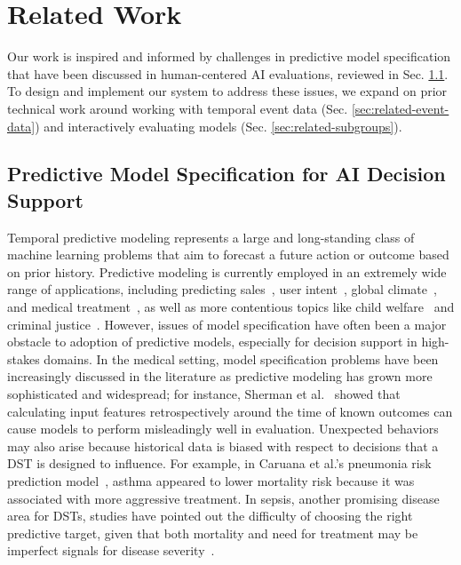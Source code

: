 \section{Related Work}
\label{sec:related-work}

Our work is inspired and informed by challenges in predictive model specification that have been discussed in human-centered AI evaluations, reviewed in Sec. \ref{sec:related-spec-issues}.
To design and implement our system to address these issues, we expand on prior technical work around working with temporal event data (Sec. \ref{sec:related-event-data}) and interactively evaluating models (Sec. \ref{sec:related-subgroups}).

\subsection{Predictive Model Specification for AI Decision Support}
\label{sec:related-spec-issues}

Temporal predictive modeling represents a large and long-standing class of machine learning problems that aim to forecast a future action or outcome based on prior history.
Predictive modeling is currently employed in an extremely wide range of applications, including predicting sales~\cite{tsoumakas_survey_2019}, user intent~\cite{Caruccio2015}, global climate~\cite{Dueben2018}, and medical treatment~\cite{Sivaraman2023}, as well as more contentious topics like child welfare~\cite{Kawakami2022partnerships} and criminal justice~\cite{Grgic-Hlaca2018}.
However, issues of model specification have often been a major obstacle to adoption of predictive models, especially for decision support in high-stakes domains.
In the medical setting, model specification problems have been increasingly discussed in the literature as predictive modeling has grown more sophisticated and widespread; for instance, Sherman et al.~\cite{sherman_leveraging_2018} showed that calculating input features retrospectively around the time of known outcomes can cause models to perform misleadingly well in evaluation.
Unexpected behaviors may also arise because historical data is biased with respect to decisions that a DST is designed to influence. For example, in Caruana et al.'s pneumonia risk prediction model~\cite{caruana_intelligible_2015}, asthma appeared to lower mortality risk because it was associated with more aggressive treatment.
In sepsis, another promising disease area for DSTs, studies have pointed out the difficulty of choosing the right predictive target, given that both mortality and need for treatment may be imperfect signals for disease severity~\cite{Sivaraman2023,Sendak2020}.

